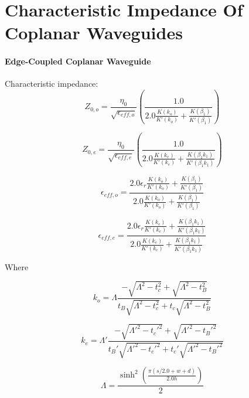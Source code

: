 \section{Characteristic Impedance Of Coplanar Waveguides} \label{app:waveguides}
\paragraph{Edge-Coupled Coplanar Waveguide}

Characteristic impedance\cite[~p197-198]{wadell}: 
\begin{equation}
	Z_{0,o} = \frac{\eta_0}{\sqrt{\epsilon_{eff,o}}} \left( \frac{1.0}{2.0 \frac{K(k_o)}{K'(k_o)} + \frac{K(\beta_1)}{K'(\beta_1)}}\right)
\end{equation}    

\begin{equation}
	Z_{0,e} = \frac{\eta_0}{\sqrt{\epsilon_{eff,e}}} \left( \frac{1.0}{2.0 \frac{K(k_e)}{K'(k_e)} + \frac{K(\beta_1 k_1)}{K'(\beta_1 k_1)}}\right)
\end{equation} 


\begin{equation}
	\epsilon_{eff,o} = \frac{2.0 \epsilon_r \frac{K(k_o)}{K'(k_o)} + \frac{K(\beta_1)}{K'(\beta_1)}}{2.0 \frac{K(k_o)}{K'(k_o)} + \frac{K(\beta_1)}{K'(\beta_1)}}
\end{equation}

\begin{equation}
	\epsilon_{eff,e} = \frac{2.0 \epsilon_r \frac{K(k_e)}{K'(k_e)} + \frac{K(\beta_1 k_1)}{K'(\beta_1 k_1)}}{2.0 \frac{K(k_e)}{K'(k_e)} + \frac{K(\beta_1 k_1)}{K'(\beta_1 k_1)}}
\end{equation}

Where

\begin{equation}
	k_o = \Lambda \frac{-\sqrt{\Lambda^2 - t_c^2} + \sqrt{\Lambda^2 - t_B^2}}{t_B\sqrt{\Lambda^2 - t_c^2} + t_c \sqrt{\Lambda^2 - t_B^2}}
\end{equation}

\begin{equation}
	k_e = \Lambda' \frac{-\sqrt{\Lambda'^2 - t_c'^2} + \sqrt{\Lambda'^2 - t_B'^2}}{t_B'\sqrt{\Lambda'^2 - t_c'^2} + t_c' \sqrt{\Lambda'^2 - t_B'^2}}
\end{equation}


\begin{equation}
	\Lambda = \frac{\sinh^2 \left( \frac{\pi (s/2.0 + w + d)}{2.0 h} \right) }{2}
\end{equation}

